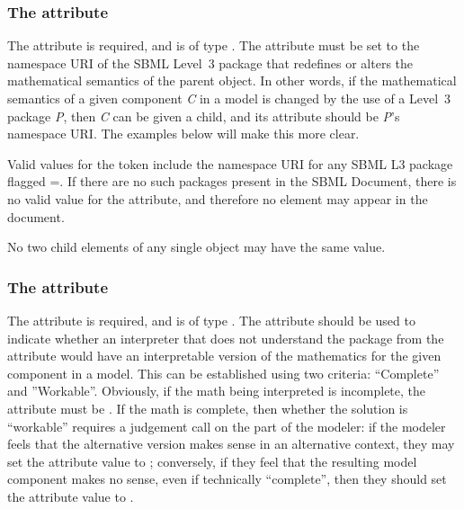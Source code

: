 \subsubsection{The \fixttspace{} attribute}
\label{attribute-changedBy}

The  attribute is required, and is of type .  The attribute must be set to the namespace URI of the SBML Level~3 package that redefines or alters the mathematical semantics of the parent object.  In other words, if the mathematical semantics of a given component \emph{C} in a model is changed by the use of a Level~3 package \emph{P}, then \emph{C} can be given a \ChangedMath child, and its attribute  should be \emph{P}'s namespace URI.  The examples below will make this more clear.

Valid values for the  token include the namespace URI for any SBML L3 package flagged  =.  If there are no such packages present in the SBML Document, there is no valid value for the  attribute, and therefore no \ChangedMath element may appear in the document.

No two child \ChangedMath elements of any single \SBase object may have the same  value.  


\subsubsection{The \fixttspace{} attribute}
\label{attribute-absenceleavesalternative}

The  attribute is required, and is of type .  The attribute should be used to indicate whether an interpreter that does not understand the package from the  attribute would have an interpretable version of the mathematics for the given component in a model.  This can be established using two criteria:  ``Complete'' and ''Workable''.  Obviously, if the math being interpreted is incomplete, the  attribute must be .  If the math is complete, then whether the solution is ``workable'' requires a judgement call on the part of the modeler: if the modeler feels that the alternative version makes sense in an alternative context, they may set the attribute value to ; conversely, if they feel that the resulting model component makes no sense, even if technically ``complete'', then they should set the attribute value to .

